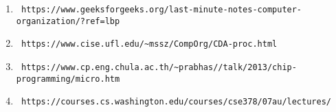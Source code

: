 
\begin{enumerate}
    \item \begin{verbatim} https://www.geeksforgeeks.org/last-minute-notes-computer-organization/?ref=lbp \end{verbatim}

    \item \begin{verbatim} https://www.cise.ufl.edu/~mssz/CompOrg/CDA-proc.html \end{verbatim}

    \item \begin{verbatim} https://www.cp.eng.chula.ac.th/~prabhas//talk/2013/chip-programming/micro.htm \end{verbatim}

    \item \begin{verbatim} https://courses.cs.washington.edu/courses/cse378/07au/lectures/ \end{verbatim}
\end{enumerate}
